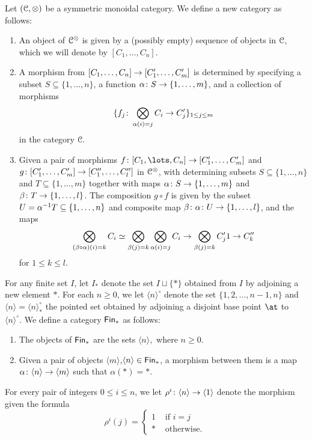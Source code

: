 \begin{construction}
    Let $(\mathcal C,\otimes)$ be a symmetric monoidal category. We define a new category as follows:
    \begin{enumerate}
        \item An object of $\mathcal C^\otimes$ is given by a (possibly empty) sequence of objects in $\mathcal C$, which we will denote by $[C_1,\ldots,C_n]$.
        \item A morphism from $[C_1,\ldots,C_n]\rightarrow [C_1',\ldots,C_m']$ is determined by specifying a subset $S\subseteq \{1,\ldots,n\}$, a function $\alpha\colon S \rightarrow \{1,\ldots,m\}$, and a collection of morphisms \[\{f_j\colon \bigotimes_{\alpha(i)=j} C_i \rightarrow C_j'\}_{1\leq j\leq m}\] in the category $\mathcal C.$
        \item Given a pair of morphisms $f\colon [C_1,\lots, C_n]\ra [C_1',\ldots,C_m']$ and $g\colon [C'_1,\ldots,C_m'] \rightarrow [C''_1,\ldots,C''_l]$ in $\mathcal C^{\otimes}$, with determining subsets $S\subseteq \{1,\ldots,n\}$ and $T\subseteq \{1,\ldots, m\}$ together with maps $\alpha\colon S \rightarrow \{1,\ldots, m\}$ and $\beta \colon T \rightarrow \{1,\ldots,l \}$. The composition $g\circ f$ is given by the subset $U=\alpha^{-1}T\subseteq\{1,\ldots,n \}$ and composite map $\beta\colon \alpha \colon U \rightarrow \{1,\ldots,l \}$, and the maps \[\bigotimes_{(\beta\circ \alpha)(i)=k}C_i\simeq \bigotimes_{\beta(j)=k}\bigotimes_{\alpha(i)=j}C_i \rightarrow \bigotimes_{\beta(j)=k} C_j'1 \rightarrow C_{k}''\] for $1\leq k\leq l.$ 
    \end{enumerate}
\begin{notation}
    For any finite set $I$, let $I_\ast$ denote the set $I\sqcup\{\ast\}$ obtained from $I$ by adjoining a new element $\ast$. For each $n\geq 0$, we let $\langle n\rangle ^{\circ}$ denote the set $\{1,2,\ldots,n-1,n\}$ and $\langle n\rangle =\langle n\rangle_\ast^{\circ}$ the pointed set obtained by adjoining a disjoint base point $\at$ to $\langle n \rangle ^\circ.$ We define a category $\operatorname{\sf Fin}_\ast$ as follows:
    \begin{enumerate}
        \item The objects of $\operatorname{\sf Fin}_\ast$ are the sets $\langle n \rangle,$ where $n\geq 0.$
        \item Given a pair of objects $\langle m \rangle$,$\langle n \rangle \in\operatorname{\sf Fin}_\ast$, a morphism between them is a map $\alpha\colon \langle n\rangle \rightarrow \langle m\rangle$ such that $\alpha(\ast)=\ast.$
    \end{enumerate}
    For every pair of integers $0\leq i\leq n$, we let $\rho^{i}\colon \langle n\rangle \rightarrow \langle 1\rangle$ denote the morphism given the formula \[ \rho^{i}(j) = \begin{cases} 1 & \text{ if } i=j \\ \ast & \text{ otherwise. }  \end{cases}\]
\end{notation}
\end{construction}

